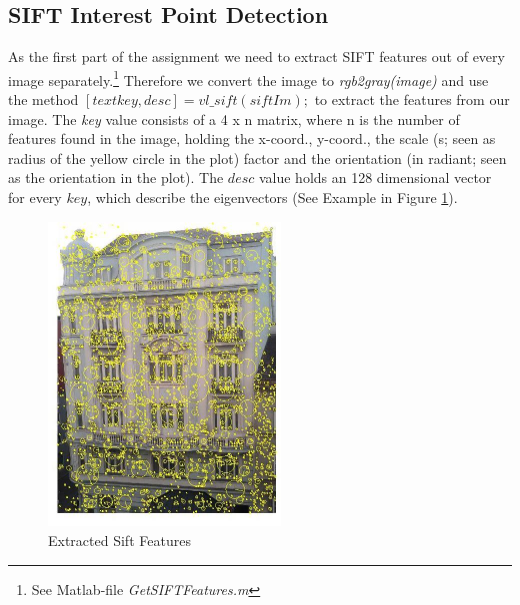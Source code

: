 \documentclass[subfigure,epsfig,fleqn,float,numbers=noenddot]{scrartcl}
\begin{document}
\subsection{SIFT Interest Point Detection}
\label{sec:A}
As the first part of the assignment we need to extract SIFT features out of every image separately.\footnote{See Matlab-file \emph{GetSIFTFeatures.m} } Therefore we convert the image to \emph{rgb2gray(image)} and use the method $[text{key, desc}] = vl\_sift(siftIm);$ to extract the features from our image. The \emph{key} value consists of a 4 x n matrix, where n is the number of features found in the image, holding the x-coord., y-coord., the scale (s; seen as radius of the yellow circle in the plot) factor and the orientation (in radiant; seen as the orientation in the plot). The $desc$ value holds an 128 dimensional vector for every $key$, which describe the eigenvectors (See Example in Figure \ref{img:sift}). 
	\begin{figure}[H]
		\centering
		\includegraphics[width=0.55\textwidth]{./img/siftDesc2.jpg}
		\caption{Extracted Sift Features}
		\label{img:sift}
	\end{figure}
\end{document}
